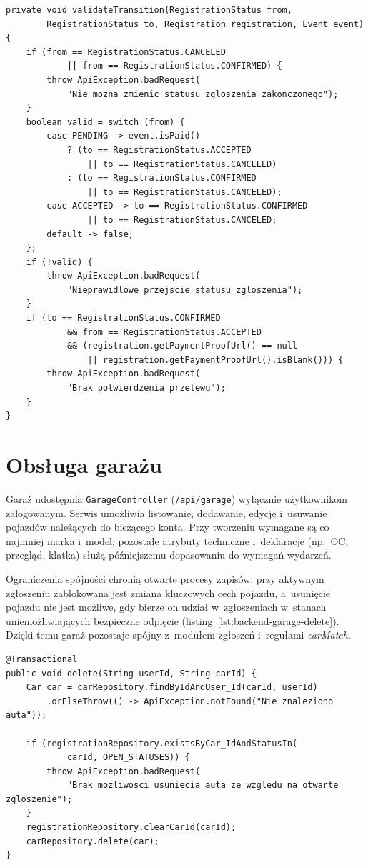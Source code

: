 \documentclass{sprz}
\begin{document}
\begin{lstlisting}[caption={Walidacja przejść statusu zgłoszenia},label={lst:backend-reg-transition}]
private void validateTransition(RegistrationStatus from,
        RegistrationStatus to, Registration registration, Event event) {
    if (from == RegistrationStatus.CANCELED
            || from == RegistrationStatus.CONFIRMED) {
        throw ApiException.badRequest(
            "Nie mozna zmienic statusu zgloszenia zakonczonego");
    }
    boolean valid = switch (from) {
        case PENDING -> event.isPaid()
            ? (to == RegistrationStatus.ACCEPTED
                || to == RegistrationStatus.CANCELED)
            : (to == RegistrationStatus.CONFIRMED
                || to == RegistrationStatus.CANCELED);
        case ACCEPTED -> to == RegistrationStatus.CONFIRMED
                || to == RegistrationStatus.CANCELED;
        default -> false;
    };
    if (!valid) {
        throw ApiException.badRequest(
            "Nieprawidlowe przejscie statusu zgloszenia");
    }
    if (to == RegistrationStatus.CONFIRMED
            && from == RegistrationStatus.ACCEPTED
            && (registration.getPaymentProofUrl() == null
                || registration.getPaymentProofUrl().isBlank())) {
        throw ApiException.badRequest(
            "Brak potwierdzenia przelewu");
    }
}
\end{lstlisting}

\section{Obsługa garażu}
Garaż udostępnia \texttt{GarageController} (\texttt{/api/garage}) wyłącznie użytkownikom zalogowanym. Serwis umożliwia listowanie, dodawanie, edycję i~usuwanie pojazdów należących do bieżącego konta. Przy tworzeniu wymagane są co najmniej marka i~model; pozostałe atrybuty techniczne i~deklaracje (np.\ OC, przegląd, klatka) służą późniejszemu dopasowaniu do wymagań wydarzeń.

Ograniczenia spójności chronią otwarte procesy zapisów: przy aktywnym zgłoszeniu zablokowana jest zmiana kluczowych cech pojazdu, a~usunięcie pojazdu nie jest możliwe, gdy bierze on udział w~zgłoszeniach w~stanach uniemożliwiających bezpieczne odpięcie (listing~\ref{lst:backend-garage-delete}). Dzięki temu garaż pozostaje spójny z~modułem zgłoszeń i~regułami \emph{carMatch}.

\begin{lstlisting}[caption={Usuwanie pojazdu z blokadą przy otwartym zgłoszeniu},label={lst:backend-garage-delete}]
@Transactional
public void delete(String userId, String carId) {
    Car car = carRepository.findByIdAndUser_Id(carId, userId)
        .orElseThrow(() -> ApiException.notFound("Nie znaleziono auta"));

    if (registrationRepository.existsByCar_IdAndStatusIn(
            carId, OPEN_STATUSES)) {
        throw ApiException.badRequest(
            "Brak mozliwosci usuniecia auta ze wzgledu na otwarte zgloszenie");
    }
    registrationRepository.clearCarId(carId);
    carRepository.delete(car);
}
\end{lstlisting}
\end{document}

